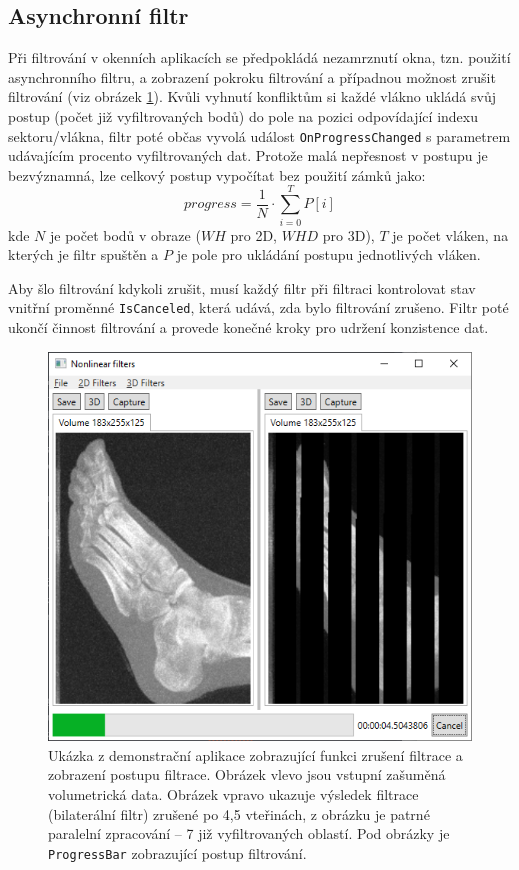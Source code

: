 \subsection*{Asynchronní filtr}
Při filtrování v okenních aplikacích se předpokládá nezamrznutí okna, tzn. použití asynchronního filtru, a zobrazení pokroku filtrování a případnou možnost zrušit filtrování (viz obrázek \ref{fig:impl:demo_cancel}).
Kvůli vyhnutí konfliktům si každé vlákno ukládá svůj postup (počet již vyfiltrovaných bodů) do pole na pozici odpovídající indexu sektoru/vlákna, filtr poté občas vyvolá událost \texttt{OnProgressChanged} s parametrem udávajícím procento vyfiltrovaných dat. Protože malá nepřesnost v postupu je bezvýznamná, lze celkový postup vypočítat bez použití zámků jako:
\begin{equation*}
    progress = \frac{1}{N} \cdot \displaystyle\sum_{i=0}^T{P[i]}
\end{equation*}
kde $N$ je počet bodů v obraze ($WH$ pro 2D, $WHD$ pro 3D), $T$ je počet vláken, na kterých je filtr spuštěn a $P$ je pole pro ukládání postupu jednotlivých vláken. 

Aby šlo filtrování kdykoli zrušit, musí každý filtr při filtraci kontrolovat stav vnitřní proměnné \texttt{IsCanceled}, která udává, zda bylo filtrování zrušeno. Filtr poté ukončí činnost filtrování a provede konečné kroky pro udržení konzistence dat.

\begin{figure} [H]
    \centering
    \label{fig:impl:demo_cancel}
    \includegraphics[width=1\textwidth]{figures/demo_cancel.png}
    \caption{Ukázka z demonstrační aplikace zobrazující funkci zrušení filtrace a zobrazení postupu filtrace. Obrázek vlevo jsou vstupní zašuměná volumetrická data. Obrázek vpravo ukazuje výsledek filtrace (bilaterální filtr) zrušené po 4,5 vteřinách, z obrázku je patrné paralelní zpracování -- 7 již vyfiltrovaných oblastí. Pod obrázky je \texttt{ProgressBar} zobrazující postup filtrování.}
\end{figure}

